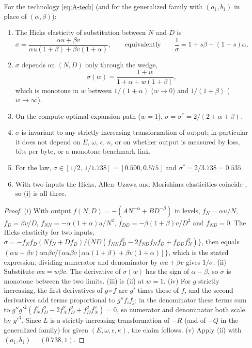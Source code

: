 \begin{lemma}\label{lem:sigma}
For the technology \eqref{eq:A-tech} (and for the generalized family with $(a_1,b_1)$ in place of $(\alpha,\beta)$):
\begin{enumerate}
\item[(i)] The Hicks elasticity of substitution between $N$ and $D$ is
\[
\sigma=\frac{\alpha u+\beta v}{\alpha u(1+\beta)+\beta v(1+\alpha)},\qquad\text{equivalently}\qquad \frac1\sigma=1+s\beta+(1-s)\alpha.
\]
\item[(ii)] $\sigma$ depends on $(N,D)$ only through the wedge,
\[
\sigma(w)=\frac{1+w}{1+\alpha+w(1+\beta)},
\]
which is monotone in $w$ between $1/(1+\alpha)$ ($w\to0$) and $1/(1+\beta)$ ($w\to\infty$).
\item[(iii)] On the compute-optimal expansion path ($w=1$), $\sigma=\sigma^*=2/(2+\alpha+\beta)$.
\item[(iv)] $\sigma$ is invariant to any strictly increasing transformation of output; in particular it does not depend
on $E$, $\omega$, $\epsilon$, $\kappa$, or on whether output is measured by loss, bits per byte, or a monotone
benchmark link.
\item[(v)] For the \citet{kaplan2020scaling} law, $\sigma\in[1/2,\,1/1.738]=[0.500,0.575]$ and $\sigma^*=2/3.738=0.535$.
\item[(vi)] With two inputs the Hicks, Allen--Uzawa and Morishima elasticities coincide \citep{blackorby1989real}, so (i)
is all three.
\end{enumerate}
\end{lemma}

\begin{proof}
(i) With output $f(N,D)=-(AN^{-\alpha}+BD^{-\beta})$ in levels, $f_N=\alpha u/N$, $f_D=\beta v/D$,
$f_{NN}=-\alpha(1+\alpha)u/N^2$, $f_{DD}=-\beta(1+\beta)v/D^2$ and $f_{ND}=0$. The Hicks elasticity for two inputs,
$\sigma=-f_Nf_D(Nf_N+Df_D)/\{ND(f_{NN}f_D^2-2f_{ND}f_Nf_D+f_{DD}f_N^2)\}$, then equals
$(\alpha u+\beta v)\alpha u\beta v/\{\alpha u\beta v[\alpha u(1+\beta)+\beta v(1+\alpha)]\}$, which is the stated
expression; dividing numerator and denominator by $\alpha u+\beta v$ gives $1/\sigma$. (ii) Substitute
$\alpha u=w\beta v$. The derivative of $\sigma(w)$ has the sign of $\alpha-\beta$, so $\sigma$ is monotone between the two
limits. (iii) is (ii) at $w=1$. (iv) For $g$ strictly increasing, the first derivatives of $g\circ f$ are $g'$ times
those of $f$, and the second derivatives add terms proportional to $g''f_if_j$; in the denominator these terms sum to
$g''g'^2(f_N^2f_D^2-2f_N^2f_D^2+f_D^2f_N^2)=0$, so numerator and denominator both scale by $g'^3$. Since $L$ is a
strictly increasing transformation of $-R$ (and of $-Q$ in the generalized family) for given $(E,\omega,\epsilon,\kappa)$,
the claim follows. (v) Apply (ii) with $(a_1,b_1)=(0.738,1)$.
\end{proof}

